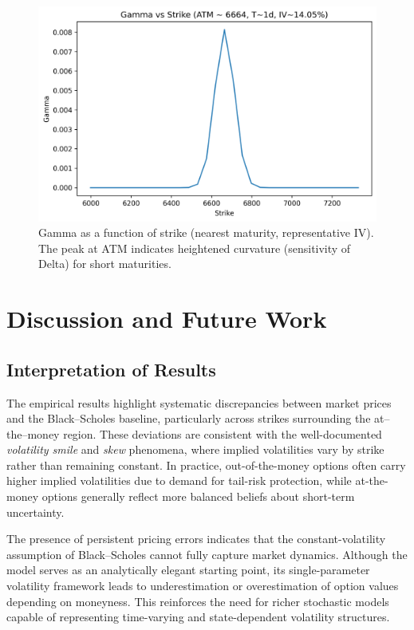 \documentclass[12pt]{article}
\begin{document}
\begin{figure}[H]
\centering
\includegraphics[width=0.85\linewidth]{gamma_vs_strike.png}
\caption{Gamma as a function of strike (nearest maturity, representative IV). The peak at ATM indicates heightened
curvature (sensitivity of Delta) for short maturities.}
\label{fig:gamma}
\end{figure}

\FloatBarrier %

\section{Discussion and Future Work}

\subsection{Interpretation of Results}
The empirical results highlight systematic discrepancies between market prices and the Black--Scholes baseline, particularly across strikes surrounding the at--the--money region. These deviations are consistent with the well-documented \emph{volatility smile} and \emph{skew} phenomena, where implied volatilities vary by strike rather than remaining constant. In practice, out-of-the-money options often carry higher implied volatilities due to demand for tail-risk protection, while at-the-money options generally reflect more balanced beliefs about short-term uncertainty.

The presence of persistent pricing errors indicates that the constant-volatility assumption of Black--Scholes cannot fully capture market dynamics. Although the model serves as an analytically elegant starting point, its single-parameter volatility framework leads to underestimation or overestimation of option values depending on moneyness. This reinforces the need for richer stochastic models capable of representing time-varying and state-dependent volatility structures.
\end{document}
